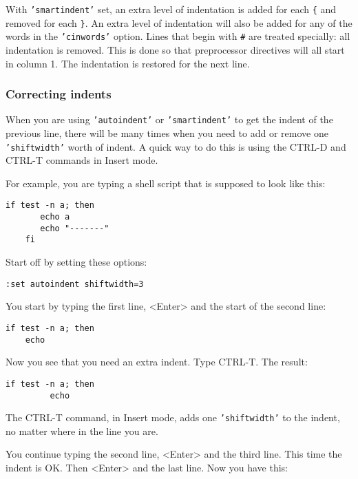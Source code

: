 With \texttt{'smartindent'} set, an extra level of indentation is added for each \texttt{\{} and removed for each \texttt{\}}.
An extra level of indentation will also be added for any of the words in the \texttt{'cinwords'} option.
Lines that begin with \texttt{\#} are treated specially: all indentation is removed.
This is done so that preprocessor directives will all start in column 1.
The indentation is restored for the next line.

\subsubsection{Correcting indents}
When you are using \texttt{'autoindent'} or \texttt{'smartindent'} to get the indent of the previous line, there will be many times when you need to add or remove one \texttt{'shiftwidth'} worth of indent.
A quick way to do this is using the CTRL-D and CTRL-T commands in Insert mode.

For example, you are typing a shell script that is supposed to look like this:

\begin{Verbatim}[samepage=true]
    if test -n a; then 
       echo a 
       echo "-------" 
    fi 
\end{Verbatim}

Start off by setting these options:

\begin{Verbatim}[samepage=true]
 :set autoindent shiftwidth=3
\end{Verbatim}

You start by typing the first line, <Enter> and the start of the second line:

\begin{Verbatim}[samepage=true]
    if test -n a; then 
    echo 
\end{Verbatim}

Now you see that you need an extra indent.
Type CTRL-T.
The result:

\begin{Verbatim}[samepage=true]
    if test -n a; then 
         echo 
\end{Verbatim}

The CTRL-T command, in Insert mode, adds one \texttt{'shiftwidth'} to the indent, no matter where in the line you are.

You continue typing the second line, <Enter> and the third line.
This time the indent is OK.
Then <Enter> and the last line.
Now you have this:

